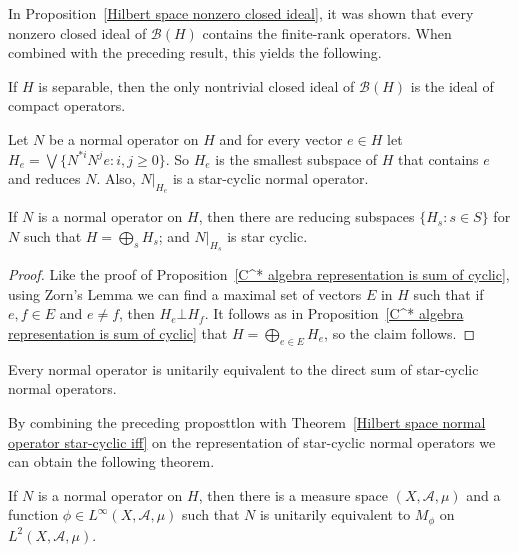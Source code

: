 In Proposition~\ref{Hilbert space nonzero closed ideal}, it was shown that every nonzero closed ideal of $\mathcal{B}(H)$ contains the finite-rank operators. When combined with the preceding result, this yields the following.
\begin{corollary}
If $H$ is separable, then the only nontrivial closed ideal of $\mathcal{B}(H)$ is the ideal of compact operators.
\end{corollary}
Let $N$ be a normal operator on $H$ and for every vector $e\in H$ let $H_e=\bigvee\{N^{*i}N^je:i,j\geq 0\}$. So $H_e$ is the smallest subspace of $H$ that contains $e$ and reduces $N$. Also, $N|_{H_e}$ is a star-cyclic normal operator.
\begin{proposition}
If $N$ is a normal operator on $H$, then there are reducing subspaces $\{H_s:s\in S\}$ for $N$ such that $H=\bigoplus_sH_s$; and $N|_{H_s}$ is star cyclic.
\end{proposition}
\begin{proof}
Like the proof of Proposition~\ref{C^* algebra representation is sum of cyclic}, using Zorn's Lemma we can find a maximal set of vectors $E$ in $H$ such that if $e,f\in E$ and $e\neq f$, then $H_e\bot H_f$. It follows as in Proposition~\ref{C^* algebra representation is sum of cyclic} that $H=\bigoplus_{e\in E}H_e$, so the claim follows.
\end{proof}
\begin{corollary}
Every normal operator is unitarily equivalent to the direct sum of star-cyclic normal operators.
\end{corollary}
By combining the preceding proposttlon with Theorem~\ref{Hilbert space normal operator star-cyclic iff} on the representation of star-cyclic normal operators we can obtain the following theorem.
\begin{theorem}\label{Hilbert space normal operator equivalent to multiplication}
If $N$ is a normal operator on $H$, then there is a measure space $(X,\mathcal{A},\mu)$ and a function $\phi\in L^\infty(X,\mathcal{A},\mu)$ such that $N$ is unitarily equivalent to $M_\phi$ on $L^2(X,\mathcal{A},\mu)$.
\end{theorem}
